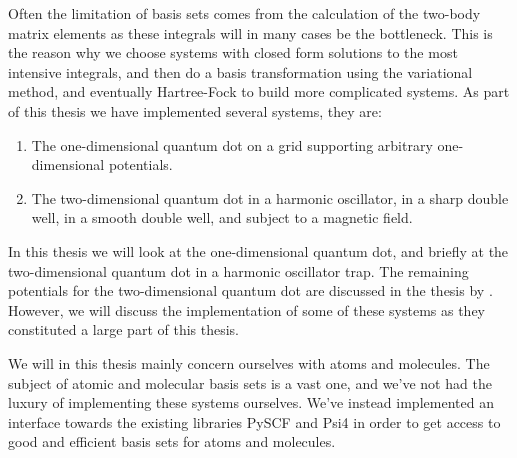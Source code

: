     Often the limitation of basis sets comes from the calculation of the
    two-body matrix elements as these integrals will in many cases be the
    bottleneck.
    This is the reason why we choose systems with closed form solutions to the
    most intensive integrals, and then do a basis transformation using the
    variational method, and eventually Hartree-Fock to build more complicated
    systems.
    As part of this thesis we have implemented several systems, they are:
    \begin{enumerate}
        \item The one-dimensional quantum dot on a grid supporting arbitrary
            one-dimensional potentials.
        \item The two-dimensional quantum dot in a harmonic oscillator, in a
            sharp double well, in a smooth double well, and subject to a
            magnetic field.
    \end{enumerate}
    In this thesis we will look at the one-dimensional quantum dot, and briefly
    at the two-dimensional quantum dot in a harmonic oscillator trap.
    The remaining potentials for the two-dimensional quantum dot are discussed
    in the thesis by \citeauthor{greg-winther} \cite{greg-winther}.
    However, we will discuss the implementation of some of these systems as they
    constituted a large part of this thesis.

    We will in this thesis mainly concern ourselves with atoms and molecules.
    The subject of atomic and molecular basis sets is a vast one, and we've not
    had the luxury of implementing these systems ourselves.
    We've instead implemented an interface towards the existing libraries PySCF
    \cite{pyscf} and Psi4 \cite{psi4} in order to get access to good and
    efficient basis sets for atoms and molecules.


    

